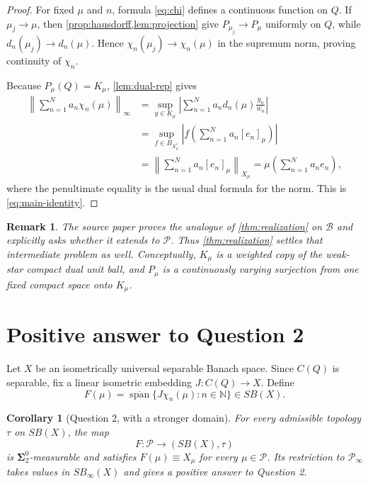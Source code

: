 \documentclass[11pt]{article}
\newtheorem{corollary}[theorem]{Corollary}
\newtheorem{remark}[theorem]{Remark}
\theoremstyle{definition}
\newcommand{\Pcal}{\mathcal P}
\newcommand{\Bcal}{\mathcal B}
\newcommand{\N}{\mathbb N}
\newcommand{\clspan}{\overline{\operatorname{span}}}
\newcommand{\Ball}{B}
\newcommand{\equiviso}{\equiv}
\newcommand{\SigmaTwo}{\boldsymbol{\Sigma}^{0}_{2}}
\begin{document}
\begin{proof}
For fixed $\mu$ and $n$, formula \eqref{eq:chi} defines a continuous function on
$Q$.  If $\mu_j\to\mu$, then \cref{prop:hausdorff,lem:projection} give
$P_{\mu_j}\to P_\mu$ uniformly on $Q$, while
$d_n(\mu_j)\to d_n(\mu)$.  Hence
$\chi_n(\mu_j)\to\chi_n(\mu)$ in the supremum norm, proving continuity of
$\chi_n$.

Because $P_\mu(Q)=K_\mu$, \cref{lem:dual-rep} gives
\begin{align*}
 \left\|\sum_{n=1}^N a_n\chi_n(\mu)\right\|_\infty
 &=\sup_{y\in K_\mu}
   \left|\sum_{n=1}^N a_nd_n(\mu)\frac{y_n}{w_n}\right|\\
 &=\sup_{f\in\Ball_{X_\mu^*}}
   \left|f\left(\sum_{n=1}^N a_n[e_n]_\mu\right)\right|\\
 &=\left\|\sum_{n=1}^N a_n[e_n]_\mu\right\|_{X_\mu}
 =\mu\left(\sum_{n=1}^N a_ne_n\right),
\end{align*}
where the penultimate equality is the usual dual formula for the norm.  This is
\eqref{eq:main-identity}.
\end{proof}

\begin{remark}
The source paper proves the analogue of \cref{thm:realization} on $\Bcal$ and
explicitly asks whether it extends to $\Pcal$.  Thus \cref{thm:realization}
settles that intermediate problem as well.  Conceptually, $K_\mu$ is a weighted
copy of the weak-star compact dual unit ball, and $P_\mu$ is a continuously
varying surjection from one fixed compact space onto $K_\mu$.
\end{remark}

\section{Positive answer to Question 2}

Let $X$ be an isometrically universal separable Banach space.  Since $C(Q)$ is
separable, fix a linear isometric embedding $J:C(Q)\to X$.  Define
\[
 F(\mu)=\clspan\{J\chi_n(\mu):n\in\N\}\in SB(X).
 \tag{6.1}\label{eq:Fmu}
\]

\begin{corollary}[Question 2, with a stronger domain]\label{cor:q2}
For every admissible topology $\tau$ on $SB(X)$, the map
\[
 F:\Pcal\longrightarrow(SB(X),\tau)
\]
is $\SigmaTwo$-measurable and satisfies $F(\mu)\equiviso X_\mu$ for every
$\mu\in\Pcal$.  Its restriction to $\Pcal_\infty$ takes values in
$SB_\infty(X)$ and gives a positive answer to Question 2.
\end{corollary}
\end{document}
